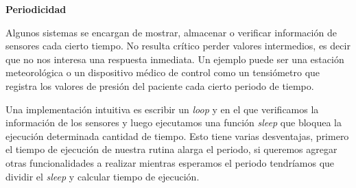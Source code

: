 \begin{figure}[H]
\begin{center}
\end{center}
\end{figure}


\textbf{Periodicidad}

Algunos sistemas se encargan de mostrar, almacenar o verificar información de sensores cada cierto tiempo. No resulta crítico perder valores intermedios, es decir que no nos interesa una respuesta inmediata. Un ejemplo puede ser una estación meteorológica o un dispositivo médico de control como un tensiómetro que registra los valores de presión del paciente cada cierto periodo de tiempo.

Una implementación intuitiva es escribir un \textit{loop} y en el que verificamos la información de los sensores y luego ejecutamos una función \textit{sleep} que bloquea la ejecución determinada cantidad de tiempo. Esto tiene varias desventajas, primero el tiempo de ejecución de nuestra rutina alarga el periodo, si queremos agregar otras funcionalidades a realizar mientras esperamos el periodo tendríamos que dividir el \textit{sleep} y calcular tiempo de ejecución.

